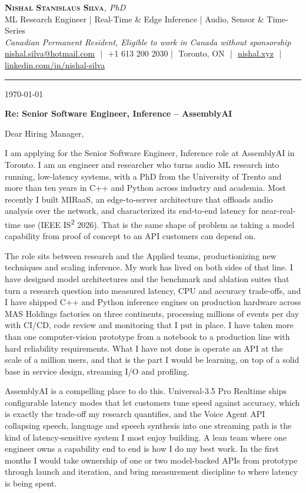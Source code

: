 \documentclass[11pt]{article}
\makeatletter
\newcommand{\clName}{Nishal Stanislaus Silva}
\newcommand{\clEmail}{nishal.silva@hotmail.com}
\newcommand{\clPhone}{+1 613 200 2030}
\newcommand{\clCity}{Toronto, ON}
\newcommand{\clSite}{https://nishal.xyz}
\newcommand{\clLinkedIn}{https://www.linkedin.com/in/nishal-silva}
\newcommand{\clStatus}{Canadian Permanent Resident, Eligible to work in Canada without sponsorship}
\newcommand{\clTagline}{ML Research Engineer | Real-Time \& Edge Inference | Audio, Sensor \& Time-Series}
\newcommand{\clRole}{Senior Software Engineer, Inference}
\newcommand{\clCompany}{AssemblyAI}
\newcommand{\clAddressee}{Dear Hiring Manager,}
\makeatother
\begin{document}
\pagestyle{empty}
\begin{center}
    {\LARGE \scshape \textbf{\clName}}{\large \textit{, PhD}}\\[1pt]
    {\small \clTagline}\\[1pt]
    {\footnotesize\textit{\clStatus}}\\[1pt]
    {\small
    \href{mailto:\clEmail}{\clEmail} \,\,|\,\, \clPhone \,\,|\,\, \clCity
    \,\,|\,\, \href{\clSite}{nishal.xyz} \,\,|\,\, \href{\clLinkedIn}{linkedin.com/in/nishal-silva}}
\end{center}

\rule{\linewidth}{0.4pt}\vspace{0.6em}

\today

\textbf{Re: \clRole{} -- \clCompany{}}

\clAddressee

I am applying for the Senior Software Engineer, Inference role at AssemblyAI in Toronto. I am an engineer and researcher who turns audio ML research into running, low-latency systems, with a PhD from the University of Trento and more than ten years in C++ and Python across industry and academia. Most recently I built MIRaaS, an edge-to-server architecture that offloads audio analysis over the network, and characterized its end-to-end latency for near-real-time use (IEEE IS\textsuperscript{2} 2026). That is the same shape of problem as taking a model capability from proof of concept to an API customers can depend on.

The role sits between research and the Applied teams, productionizing new techniques and scaling inference. My work has lived on both sides of that line. I have designed model architectures and the benchmark and ablation suites that turn a research question into measured latency, CPU and accuracy trade-offs, and I have shipped C++ and Python inference engines on production hardware across MAS Holdings factories on three continents, processing millions of events per day with CI/CD, code review and monitoring that I put in place. I have taken more than one computer-vision prototype from a notebook to a production line with hard reliability requirements. What I have not done is operate an API at the scale of a million users, and that is the part I would be learning, on top of a solid base in service design, streaming I/O and profiling.

AssemblyAI is a compelling place to do this. Universal-3.5 Pro Realtime ships configurable latency modes that let customers tune speed against accuracy, which is exactly the trade-off my research quantifies, and the Voice Agent API collapsing speech, language and speech synthesis into one streaming path is the kind of latency-sensitive system I most enjoy building. A lean team where one engineer owns a capability end to end is how I do my best work. In the first months I would take ownership of one or two model-backed APIs from prototype through launch and iteration, and bring measurement discipline to where latency is being spent.
\end{document}
